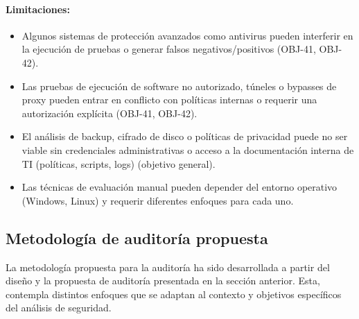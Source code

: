 \documentclass[a4paper, 10pt]{article}
\begin{document}
\paragraph{Limitaciones:}
\begin{itemize}
    \item Algunos sistemas de protección avanzados como antivirus pueden interferir en la ejecución de pruebas o generar falsos negativos/positivos (OBJ-41, OBJ-42).
    \item Las pruebas de ejecución de software no autorizado, túneles o bypasses de proxy pueden entrar en conflicto con políticas internas o requerir una autorización explícita (OBJ-41, OBJ-42).
    \item El análisis de backup, cifrado de disco o políticas de privacidad puede no ser viable sin credenciales administrativas o acceso a la documentación interna de TI (políticas, scripts, logs) (objetivo general).
    \item Las técnicas de evaluación manual pueden depender del entorno operativo (Windows, Linux) y requerir diferentes enfoques para cada uno.
\end{itemize}


\clearpage

























\subsection{Metodología de auditoría propuesta}

La metodología propuesta para la auditoría ha sido desarrollada a partir del diseño y la propuesta de auditoría presentada en la sección anterior. 
Esta, contempla distintos enfoques que se adaptan al contexto y objetivos específicos del análisis de seguridad.
\par\vspace{0.5cm}
\end{document}
